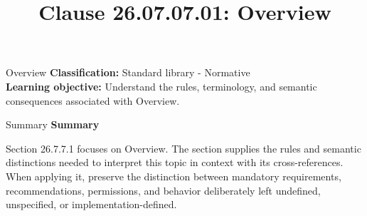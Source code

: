 \documentclass[10pt,letterpaper]{article}
\title{Clause 26.07.07.01: Overview}
\author{}
\date{}
\begin{document}
\maketitle
\begin{CornellOverviewBox}{Overview}
\textbf{Classification:} Standard library - Normative\\[2pt]
\textbf{Learning objective:} Understand the rules, terminology, and semantic consequences associated with Overview.
\end{CornellOverviewBox}\begin{CornellSummaryBox}{Summary}
{\sffamily\bfseries\color{Accent} Summary}\par\vspace{3pt}Section 26.7.7.1 focuses on Overview. The section supplies the rules and semantic distinctions needed to interpret this topic in context with its cross-references. When applying it, preserve the distinction between mandatory requirements, recommendations, permissions, and behavior deliberately left undefined, unspecified, or implementation-defined.
\end{CornellSummaryBox}
\end{document}
